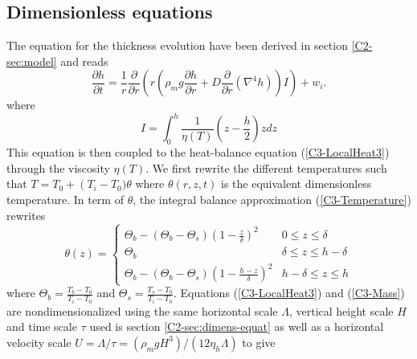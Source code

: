 \subsection{Dimensionless equations}
\label{C3-sec:dimens-equat}

The equation for the thickness  evolution have been derived in section
\ref{C2-sec:model} and reads
\begin{equation}
  \frac{\partial h}{\partial t} = \frac{1}{r}
  \frac{\partial}{\partial r} \left( r\left(\rho_m g \frac{\partial h}{\partial      r}+D\frac{\partial}{\partial      r}\left(\nabla^4h\right)\right)I\right)
  + w_i.
  \label{C2-EqConservation}
\end{equation}
where
\begin{equation}
  I = \int_0^h\frac{1}{\eta(T)}\left(z-\frac{h}{2}\right)z dz
  \label{C2-Integral}
\end{equation}
This   equation  is   then  coupled   to  the   heat-balance  equation
(\ref{C3-LocalHeat3})  through  the  viscosity  $\eta(T)$.   We  first
rewrite      the      different       temperatures      such      that
$T=T_0+\left(T_i-T_0)\theta$ where  $\theta(r,z,t)$ is  the equivalent
  dimensionless  temperature.   In  term  of  $\theta$,  the  integral
  balance approximation (\ref{C3-Temperature}) rewrites
  \begin{equation}
    \theta(z)=
    \begin{cases}
      \Theta_b -\left(\Theta_b-\Theta_s\right)(1-\frac{z}{\delta})^2& 0 \le z\le \delta \\
      \Theta_b & \delta \le z\le h-\delta \\
      \Theta_b -\left(\Theta_b-\Theta_s\right)(1-\frac{h-z}{\delta})^2
      & h-\delta \le z\le h
    \end{cases}
    \label{Temperature2}
  \end{equation}
  where            $\Theta_b=\frac{T_b-T_0}{T_{i}-T_0}$            and
  $\Theta_s        =       \frac{T_s-T_0}{T_i-T_0}$.         Equations
  (\ref{C3-LocalHeat3})  and  (\ref{C3-Mass})  are  nondimensionalized
  using the same horizontal scale $\Lambda$, vertical height scale $H$
  and time  scale $\tau$ used is  section \ref{C2-sec:dimens-equat} as
  well        as       a        horizontal       velocity        scale
  $U=\Lambda/\tau=\left(\rho_m          g          H^3\right)/\left(12
    \eta_h\Lambda\right)$ to give
